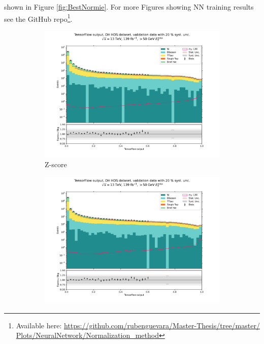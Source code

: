 \documentclass[12pt, a4paper]{book}
\begin{document}
shown in Figure \ref{fig:BestNormie}. For more Figures showing NN training results see the GitHub repo\footnote{Available here: \href{https://github.com/rubenguevara/Master-Thesis/tree/master/Plots/NeuralNetwork/Normalization_method}{https://github.com/rubenguevara/Master-Thesis/tree/master/\\Plots/NeuralNetwork/Normalization\_method}}. 
\begin{figure}[!ht]
	\centering
	\begin{subfigure}[b]{0.49\textwidth}
      \centering
      \includegraphics[width=1\textwidth]{Z_score/VAL.pdf}
      \caption{Z-score}
   \end{subfigure}
   \hfill
   \begin{subfigure}[b]{0.49\textwidth}
      \centering
      \includegraphics[width=1\textwidth]{BatchNorm/VAL.pdf}

\end{subfigure}
\end{figure}
\end{document}

